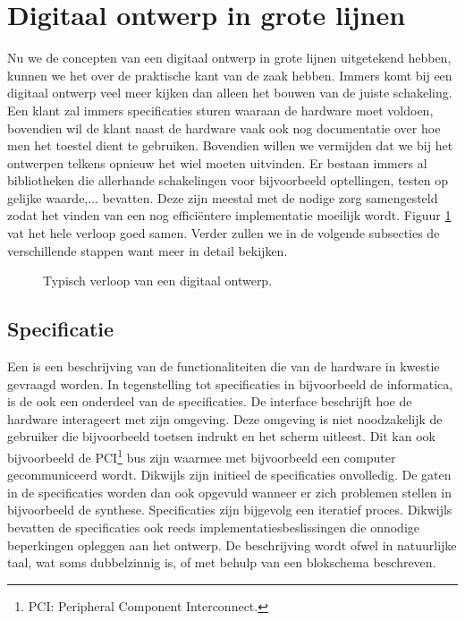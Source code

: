 \section{Digitaal ontwerp in grote lijnen}
Nu we de concepten van een digitaal ontwerp in grote lijnen uitgetekend hebben, kunnen we het over de praktische kant van de zaak hebben. Immers komt bij een digitaal ontwerp veel meer kijken dan alleen het bouwen van de juiste schakeling. Een klant zal immers specificaties sturen waaraan de hardware moet voldoen, bovendien wil de klant naast de hardware vaak ook nog documentatie over hoe men het toestel dient te gebruiken. Bovendien willen we vermijden dat we bij het ontwerpen telkens opnieuw het wiel moeten uitvinden. Er bestaan immers al bibliotheken die allerhande schakelingen voor bijvoorbeeld optellingen, testen op gelijke waarde,... bevatten. Deze zijn meestal met de nodige zorg samengesteld zodat het vinden van een nog effici\"entere implementatie moeilijk wordt. Figuur \ref{fig:digitalDesignManagement} vat het hele verloop goed samen. Verder zullen we in de volgende subsecties de verschillende stappen want meer in detail bekijken.
\begin{figure}
\centering
{}
\caption{Typisch verloop van een digitaal ontwerp.}
\label{fig:digitalDesignManagement}
\end{figure}
\subsection{Specificatie}
\label{ss:specificatie}
Een  is een beschrijving van de functionaliteiten die van de hardware in kwestie gevraagd worden. In tegenstelling tot specificaties in bijvoorbeeld de informatica, is de  ook een onderdeel van de specificaties. De interface beschrijft hoe de hardware interageert met zijn omgeving. Deze omgeving is niet noodzakelijk de gebruiker die bijvoorbeeld toetsen indrukt en het scherm uitleest. Dit kan ook bijvoorbeeld de PCI\footnote{PCI: Peripheral Component Interconnect.} bus zijn waarmee met bijvoorbeeld een computer gecommuniceerd wordt. Dikwijls zijn initieel de specificaties onvolledig. De gaten in de specificaties worden dan ook opgevuld wanneer er zich problemen stellen in bijvoorbeeld de synthese. Specificaties zijn bijgevolg een iteratief proces. Dikwijls bevatten de specificaties ook reeds implementatiesbeslissingen die onnodige beperkingen opleggen aan het ontwerp. De beschrijving wordt ofwel in natuurlijke taal, wat soms dubbelzinnig is, of met behulp van een blokschema beschreven.
